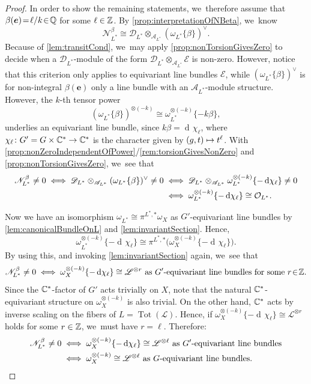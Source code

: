 \documentclass[11pt]{article}
\newcommand\mto{\mathchoice{\longmapsto}{\mapsto}{\mapsto}{\mapsto}}
\newcommand{\bme}{{\boldsymbol{e}}}
\newcommand{\cA}{\mathscr{A}}
\newcommand{\Ell}{\mathscr{L}}
\DeclareMathOperator{\differential}{d\!}
\DeclareMathOperator{\Tot}{Tot}
\begin{document}
\begin{proof}
In order to show the remaining statements, we~therefore assume that \hbox{$\beta(\bme) \!=\! \ell/k \!\in\! \Q$} for some $\ell\in{\mathbb Z}$. By \cref{prop:interpretationOfNBeta}, we~know
\[
\mathscr{N}_{L^*}^{\beta} \cong \mathscr{D}_{L^*} \otimes_{\cA_{L^*}} (\omega_{L^*}\{\beta\})^\vee.
\]
Because of \cref{lem:transitCond}, we~may apply \cref{prop:nonTorsionGivesZero} to decide when a $\mathscr D_{L^*}$\nobreakdash-mod\-ule of the form ${\mathscr D_{L^*} \otimes_{\cA_{L^*}} \mathscr E}$ is non-zero. However, notice that this criterion only applies to equivariant line bundles $\mathscr E$, while $(\omega_{L^*}\{\beta\})^\vee$ is for non-integral $\beta(\bme)$ only a line bundle with an $\cA_{L^*}$\nobreakdash-mod\-ule structure. However, the $k$-th tensor power
\[
(\omega_{L^*}\{\beta\})^{\otimes (-k)} \cong \omega_{L^*}^{\otimes (-k)}\{-k\beta\},
\]
underlies an equivariant line bundle, since $k\beta =\differential\chi_{\ell}$, where \hbox{$\chi_{\ell} \colon G'=G \times {\mathbb C}^* \to {\mathbb C}^*$} is the character given by $(g,t) \mto t^{\ell}$. With \cref{prop:nonZeroIndependentOfPower}/\cref{rem:torsionGivesNonZero} and \cref{prop:nonTorsionGivesZero}, we~see that
\begin{align*}
\mathscr N_{L^*}^\beta \neq 0 \iff\mathscr{D}_{L^*} \otimes_{\cA_{L^*}} (\omega_{L^*}\{\beta\})^\vee \neq 0
&\iff \mathscr{D}_{L^*} \otimes_{\cA_{L^*}} \omega_{L^*}^{\otimes (-k)}\{-\differential\chi_\ell\} \neq 0 \\
&\iff\omega_{L^*}^{\otimes (-k)}\{-\differential\chi_\ell\} \cong \O_{L^*}.
\end{align*}

Now we have an isomorphism $\omega_{L^*} \cong \pi^{L^*,*} \omega_X$ as $G'$-equivariant line bundles by \cref{lem:canonicalBundleOnL} and \cref{lem:invariantSection}. Hence,
\[
\omega_{L^*}^{\otimes (-k)}\{-\differential\chi_\ell\} \cong \pi^{L^*,*} \big(\omega_X^{\otimes (-k)}\{-\differential\chi_\ell\}\big).
\]
By using this, and invoking \cref{lem:invariantSection} again, we~see that
\[
\mathscr N_{L^*}^\beta \neq 0 \iff \omega_X^{\otimes (-k)}\{-\differential\chi_\ell\} \cong \Ell^{\otimes r} \text{ as $G'$-equivariant line bundles for some $r\!\in\! \Z$}.
\]
Since the ${\mathbb C}^*$-factor of $G'$ acts trivially on $X$, note that the natural ${\mathbb C}^*$-equivariant structure on $\omega_X^{\otimes (-k)}$ is also trivial. On the other hand, ${\mathbb C}^*$ acts by inverse scaling on the fibers of $L = \Tot(\Ell)$. Hence, if $\omega_X^{\otimes (-k)}\{-\differential\chi_\ell\} \cong \Ell^{\otimes r}$ holds for some $r \in {\mathbb Z}$, we~must have $r = \ell$. Therefore:
\begin{align*}
\mathscr N_{L^*}^\beta \neq 0 &\iff\omega_X^{\otimes (-k)}\{-\differential\chi_\ell\} \cong \Ell^{\otimes \ell} \text{ as $G'$-equivariant line bundles} \\
&\iff \omega_X^{\otimes (-k)} \cong \Ell^{\otimes \ell} \text{ as $G$-equivariant line bundles}. \qedhere
\end{align*}
\end{proof}
\end{document}
